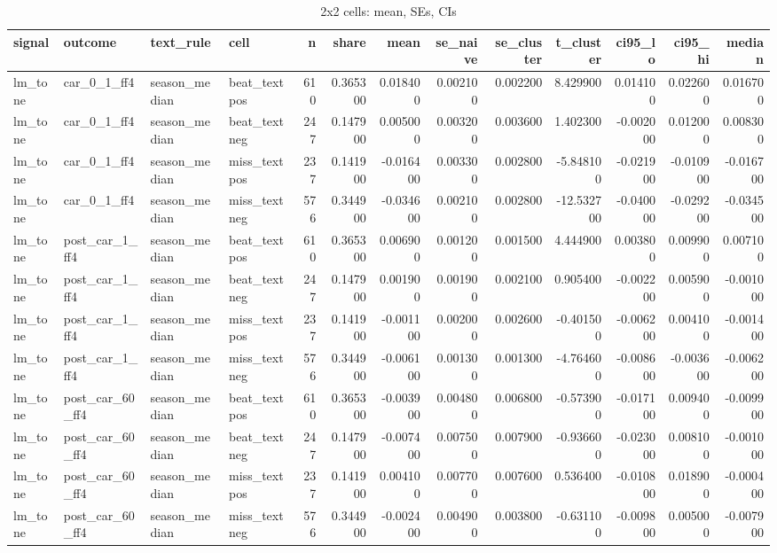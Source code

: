 \begin{table}
\caption{2x2 cells: mean, SEs, CIs}
\label{tab:t8_2x2_cells__validation}
\begin{tabular}{llllrrrrrrrrr}
\toprule
signal & outcome & text\_rule & cell & n & share & mean & se\_naive & se\_cluster & t\_cluster & ci95\_lo & ci95\_hi & median \\
\midrule
lm\_tone & car\_0\_1\_ff4 & season\_median & beat\_textpos & 610 & 0.365300 & 0.018400 & 0.002100 & 0.002200 & 8.429900 & 0.014100 & 0.022600 & 0.016700 \\
lm\_tone & car\_0\_1\_ff4 & season\_median & beat\_textneg & 247 & 0.147900 & 0.005000 & 0.003200 & 0.003600 & 1.402300 & -0.002000 & 0.012000 & 0.008300 \\
lm\_tone & car\_0\_1\_ff4 & season\_median & miss\_textpos & 237 & 0.141900 & -0.016400 & 0.003300 & 0.002800 & -5.848100 & -0.021900 & -0.010900 & -0.016700 \\
lm\_tone & car\_0\_1\_ff4 & season\_median & miss\_textneg & 576 & 0.344900 & -0.034600 & 0.002100 & 0.002800 & -12.532700 & -0.040000 & -0.029200 & -0.034500 \\
lm\_tone & post\_car\_1\_ff4 & season\_median & beat\_textpos & 610 & 0.365300 & 0.006900 & 0.001200 & 0.001500 & 4.444900 & 0.003800 & 0.009900 & 0.007100 \\
lm\_tone & post\_car\_1\_ff4 & season\_median & beat\_textneg & 247 & 0.147900 & 0.001900 & 0.001900 & 0.002100 & 0.905400 & -0.002200 & 0.005900 & -0.001000 \\
lm\_tone & post\_car\_1\_ff4 & season\_median & miss\_textpos & 237 & 0.141900 & -0.001100 & 0.002000 & 0.002600 & -0.401500 & -0.006200 & 0.004100 & -0.001400 \\
lm\_tone & post\_car\_1\_ff4 & season\_median & miss\_textneg & 576 & 0.344900 & -0.006100 & 0.001300 & 0.001300 & -4.764600 & -0.008600 & -0.003600 & -0.006200 \\
lm\_tone & post\_car\_60\_ff4 & season\_median & beat\_textpos & 610 & 0.365300 & -0.003900 & 0.004800 & 0.006800 & -0.573900 & -0.017100 & 0.009400 & -0.009900 \\
lm\_tone & post\_car\_60\_ff4 & season\_median & beat\_textneg & 247 & 0.147900 & -0.007400 & 0.007500 & 0.007900 & -0.936600 & -0.023000 & 0.008100 & -0.001000 \\
lm\_tone & post\_car\_60\_ff4 & season\_median & miss\_textpos & 237 & 0.141900 & 0.004100 & 0.007700 & 0.007600 & 0.536400 & -0.010800 & 0.018900 & -0.000400 \\
lm\_tone & post\_car\_60\_ff4 & season\_median & miss\_textneg & 576 & 0.344900 & -0.002400 & 0.004900 & 0.003800 & -0.631100 & -0.009800 & 0.005000 & -0.007900 \\

\end{tabular}
\end{table}
